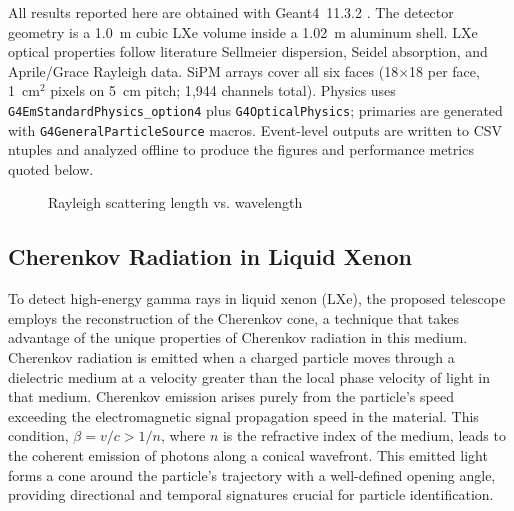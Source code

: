 \documentclass{aastex701}
\begin{document}
All results reported here are obtained with Geant4~11.3.2 \cite{Agostinelli2003,Allison2016,Tian_NextGenerationGammaRayTelescope_2025}. The detector geometry is a 1.0~m cubic LXe volume inside a 1.02~m aluminum shell. LXe optical properties follow literature Sellmeier dispersion, Seidel absorption, and Aprile/Grace Rayleigh data. SiPM arrays cover all six faces (18$\times$18 per face, 1~cm$^2$ pixels on 5~cm pitch; 1{,}944 channels total). Physics uses \texttt{G4EmStandardPhysics\_option4} plus \texttt{G4OpticalPhysics}; primaries are generated with \texttt{G4GeneralParticleSource} macros. Event-level outputs are written to CSV ntuples and analyzed offline to produce the figures and performance metrics quoted below.
\begin{figure}[h!]
\centering
{}
\caption{Rayleigh scattering length vs. wavelength \cite{Grace2017}}
\label{Rayleigh}
\end{figure}

\subsection{Cherenkov Radiation in Liquid Xenon}

To detect high-energy gamma rays in liquid xenon (LXe), the proposed telescope employs the reconstruction of the Cherenkov cone, a technique that takes advantage of the unique properties of Cherenkov radiation in this medium. Cherenkov radiation is emitted when a charged particle moves through a dielectric medium at a velocity greater than the local phase velocity of light in that medium. Cherenkov emission arises purely from the particle's speed exceeding the electromagnetic signal propagation speed in the material. This condition, $\beta = v/c > 1/n$, where $n$ is the refractive index of the medium, leads to the coherent emission of photons along a conical wavefront. This emitted light forms a cone around the particle's trajectory with a well-defined opening angle, providing directional and temporal signatures crucial for particle identification.
\end{document}
